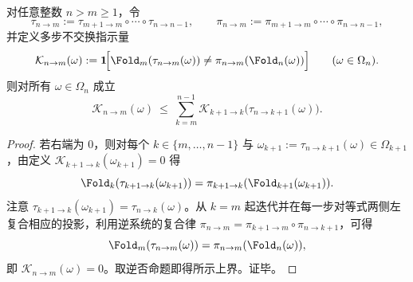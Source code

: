 \begin{lemma}[多步曲率由单步曲率事件支配]\label{lem:pom-multistep-curvature-dominated}
对任意整数 $n>m\ge 1$，令
\[
\tau_{n\to m}:=\tau_{m+1\to m}\circ\cdots\circ\tau_{n\to n-1},
\qquad
\pi_{n\to m}:=\pi_{m+1\to m}\circ\cdots\circ\pi_{n\to n-1},
\]
并定义多步不交换指示量
\[
\mathcal K_{n\to m}(\omega):=\mathbf 1\!\Big[\Fold_m(\tau_{n\to m}(\omega))\neq \pi_{n\to m}(\Fold_n(\omega))\Big]\qquad(\omega\in\Omega_n).
\]
则对所有 $\omega\in\Omega_n$ 成立
\[
\mathcal K_{n\to m}(\omega)\ \le\ \sum_{k=m}^{n-1}\mathcal K_{k+1\to k}\!\bigl(\tau_{n\to k+1}(\omega)\bigr).
\]
\end{lemma}
\begin{proof}
若右端为 $0$，则对每个 $k\in\{m,\dots,n-1\}$ 与 $\omega_{k+1}:=\tau_{n\to k+1}(\omega)\in\Omega_{k+1}$，由定义 $\mathcal K_{k+1\to k}(\omega_{k+1})=0$ 得
\[
\Fold_k(\tau_{k+1\to k}(\omega_{k+1}))=\pi_{k+1\to k}(\Fold_{k+1}(\omega_{k+1})).
\]
注意 $\tau_{k+1\to k}(\omega_{k+1})=\tau_{n\to k}(\omega)$。从 $k=m$ 起迭代并在每一步对等式两侧左复合相应的投影，利用逆系统的复合律 $\pi_{n\to m}=\pi_{k+1\to m}\circ\pi_{n\to k+1}$，可得
\[
\Fold_m(\tau_{n\to m}(\omega))=\pi_{n\to m}(\Fold_n(\omega)),
\]
即 $\mathcal K_{n\to m}(\omega)=0$。取逆否命题即得所示上界。证毕。
\end{proof}

